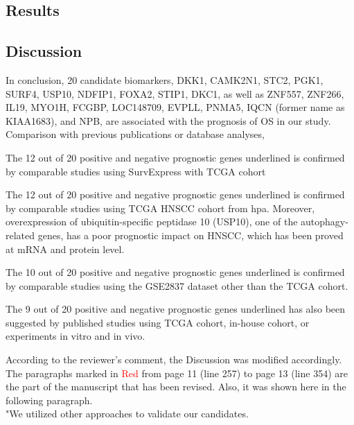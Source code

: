 \documentclass[preprint,12pt]{elsarticle}
\newenvironment{MyColorPar}[1]{%
    \leavevmode\color{#1}\ignorespaces%
}{%
}%
\begin{document}
\begin{MyColorPar}{blue}
\subsection*{Results}


\subsection*{Discussion}



\begin{outline} %
In conclusion, 20 candidate biomarkers, DKK1, CAMK2N1, STC2, PGK1, SURF4, USP10, NDFIP1, FOXA2, STIP1, DKC1, as well as ZNF557, ZNF266, IL19, MYO1H, FCGBP, LOC148709, EVPLL, PNMA5, IQCN (former name as KIAA1683), and NPB, are associated with the prognosis of OS in our study.
Comparison with previous publications or database analyses, 

\1 The 12 out of 20 positive and negative prognostic genes underlined is confirmed by comparable studies using SurvExpress with TCGA cohort

\1 The 12 out of 20 positive and negative prognostic genes underlined is confirmed by comparable studies using TCGA HNSCC cohort from \acrfull{hpa}. Moreover, overexpression of ubiquitin-specific peptidase 10 (USP10), one of the autophagy-related genes, has a poor prognostic impact on HNSCC, which has been proved at mRNA and protein level.\cite{Ren2020}

\1 The 10 out of 20 positive and negative prognostic genes underlined is confirmed by comparable studies using the GSE2837 dataset other than the TCGA cohort.

\1 The 9 out of 20 positive and negative prognostic genes underlined has also been suggested by published studies using TCGA cohort, in-house cohort, or experiments in vitro and in vivo.

\end{outline}

According to the reviewer's comment, the Discussion was modified accordingly. The paragraphs marked in \textcolor{red}{Red} from page 11 (line 257) to page 13 (line 354) are the part of the manuscript that has been revised. Also, it was shown here in the following paragraph.
\\[0.3cm]


"We utilized other approaches to validate our candidates.


\end{MyColorPar}
\end{document}
